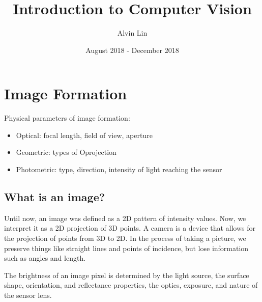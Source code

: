 \documentclass{math}
\title{Introduction to Computer Vision}
\author{Alvin Lin}
\date{August 2018 - December 2018}
\begin{document}
\maketitle

\section*{Image Formation}
Physical parameters of image formation:
\begin{itemize}
  \item Optical: focal length, field of view, aperture
  \item Geometric: types of Oprojection
  \item Photometric: type, direction, intensity of light reaching the sensor
\end{itemize}

\subsection*{What is an image?}
Until now, an image was defined as a 2D pattern of intensity values. Now, we
interpret it as a 2D projection of 3D points. A camera is a device that allows
for the projection of points from 3D to 2D. In the process of taking a picture,
we preserve things like straight lines and points of incidence, but lose
information such as angles and length. \par
The brightness of an image pixel is determined by the light source, the surface
shape, orientation, and reflectance properties, the optics, exposure, and nature
of the sensor lens.
\end{document}
